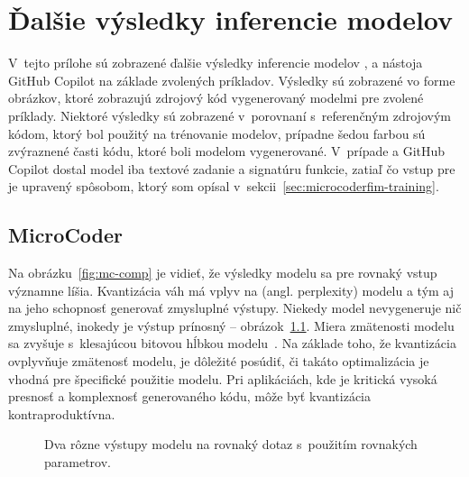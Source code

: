 \chapter{Ďalšie výsledky inferencie modelov}\label{app:more-results}
V~tejto prílohe sú zobrazené ďalšie výsledky inferencie modelov \MC{}, \MCfim{} a nástoja GitHub Copilot na základe zvolených príkladov. Výsledky sú zobrazené vo forme obrázkov, ktoré zobrazujú zdrojový kód vygenerovaný modelmi pre zvolené príklady. Niektoré výsledky sú zobrazené v~porovnaní s~referenčným zdrojovým kódom, ktorý bol použitý na trénovanie modelov, prípadne šedou farbou sú zvýraznené časti kódu, ktoré boli modelom vygenerované. V~prípade \MC{} a GitHub Copilot dostal model iba textové zadanie a signatúru funkcie, zatiaľ čo vstup pre \MCfim{} je upravený spôsobom, ktorý som opísal v~sekcii~\ref{sec:microcoderfim-training}.

\section{MicroCoder}

Na obrázku~\ref{fig:mc-comp} je vidieť, že výsledky modelu \MC{} sa pre rovnaký vstup významne líšia. Kvantizácia váh má vplyv na  (angl. perplexity) modelu a tým aj na jeho schopnosť generovať zmysluplné výstupy. Niekedy model nevygeneruje nič zmysluplné, inokedy je výstup prínosný -- obrázok~\ref{fig:mc76.1}. Miera zmätenosti modelu sa zvyšuje s~klesajúcou bitovou hĺbkou modelu~\cite{llamaquant}. Na základe toho, že kvantizácia ovplyvňuje zmätenosť modelu, je dôležité posúdiť, či takáto optimalizácia je vhodná pre špecifické použitie modelu. Pri aplikáciách, kde je kritická vysoká presnosť a komplexnosť generovaného kódu, môže byť kvantizácia kontraproduktívna.

\begin{figure}[H]
    \centering
    \caption{Dva rôzne výstupy modelu \MC{} na rovnaký dotaz s~použitím rovnakých parametrov.}
    \label{fig:mc76.1}
\end{figure}

